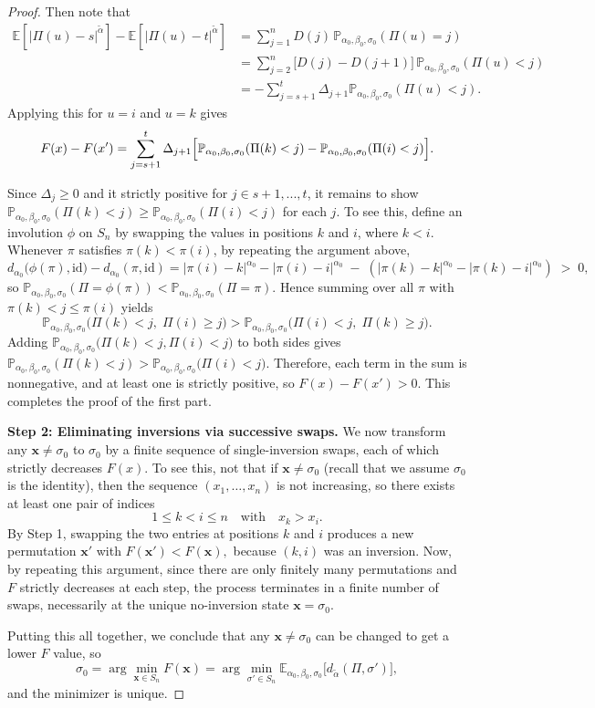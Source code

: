 \documentclass{article}
\renewcommand{\P}{\mathbb{P}}
\begin{document}
\begin{proof}
Then note that
\begin{align*}
    \mathbb{E}[|\Pi(u)-s|^{\tilde\alpha}]-\mathbb{E}[|\Pi(u)-t|^{\tilde\alpha}]
&=\sum_{j=1}^nD(j)\,\P_{\alpha_0,\beta_0,\sigma_0}(\Pi(u)=j)
\\&=\sum_{j=2}^n\bigl[D(j)-D(j+1)\bigr]\,\P_{\alpha_0,\beta_0,\sigma_0}(\Pi(u)<j)
\\&=-\sum_{j=s+1}^t\Delta_{j+1}\P_{\alpha_0,\beta_0,\sigma_0}(\Pi(u)<j).
\end{align*}
Applying this for $u=i$ and $u=k$ gives
\[
F(x)-F(x')
=\sum_{j=s+1}^t\Delta_{j+1}\Bigl[\P_{\alpha_0,\beta_0,\sigma_0}(\Pi(k)<j)-\P_{\alpha_0,\beta_0,\sigma_0}(\Pi(i)<j)\Bigr].
\]

Since $\Delta_j\geq 0$ and it strictly positive for $j\in{s+1,...,t}$, it remains to show $\P_{\alpha_0,\beta_0,\sigma_0}(\Pi(k)<j)\ge \P_{\alpha_0,\beta_0,\sigma_0}(\Pi(i)<j)$ for each $j$.  To see this, define an involution $\phi$ on $S_n$ by swapping the values in positions $k$ and $i$, where $k<i$.  Whenever $\pi$ satisfies
$\pi(k)< \pi(i)$,
by repeating the argument above,
\[
d_{\alpha_0}\bigl(\phi(\pi),\mathrm{id}\bigr)
-d_{\alpha_0}(\pi,\mathrm{id})
=\bigl|\pi(i)-k\bigr|^{\alpha_0}-\bigl|\pi(i)-i\bigr|^{\alpha_0}
\;-\;(\bigl|\pi(k)-k\bigr|^{\alpha_0}-\bigl|\pi(k)-i\bigr|^{\alpha_0})
\;>\;0,
\]
so $\P_{\alpha_0,\beta_0,\sigma_0}(\Pi=\phi(\pi))<\P_{\alpha_0,\beta_0,\sigma_0}(\Pi=\pi)$.  Hence summing over all $\pi$ with $\pi(k)<j\le\pi(i)$ yields
\[
\P_{\alpha_0,\beta_0,\sigma_0}\bigl(\Pi(k)<j,\;\Pi(i)\ge j\bigr)
> \P_{\alpha_0,\beta_0,\sigma_0}\bigl(\Pi(i)<j,\;\Pi(k)\ge j\bigr).
\]
Adding $\P_{\alpha_0,\beta_0,\sigma_0}\Big(\Pi(k)<j,\Pi(i)<j\Big)$ to both sides gives 
$\P_{\alpha_0,\beta_0,\sigma_0}(\Pi(k)<j)>\P_{\alpha_0,\beta_0,\sigma_0}\Big(\Pi(i)<j\Big)$.  
Therefore, each term in the sum is nonnegative, and at least one is strictly positive, so $F(x)-F(x')>0$.  This completes the proof of the first part.


\noindent\textbf{Step 2: Eliminating inversions via successive swaps.}  
We now transform any \(\mathbf x\neq \sigma_0\) to $\sigma_0$ by a finite sequence of single-inversion swaps, each of which strictly decreases \(F(x)\).  To see this, not that
if \(\mathbf x\neq\sigma_0\) (recall that we assume $\sigma_0$ is the identity), then the sequence \((x_1,\dots,x_n)\) is not increasing, so there exists at least one pair of indices
\[
1\le k<i\le n
\quad\text{with}\quad
x_k > x_i.
\]
By Step 1, swapping the two entries at positions \(k\) and \(i\) produces a new permutation
\(
\mathbf x'\)
with
$F(\mathbf x')<F(\mathbf x),$
because \((k,i)\) was an inversion.
Now,  by repeating this argument, since there are only finitely many permutations and \(F\) strictly decreases at each step, the process terminates in a finite number of swaps, necessarily at the unique no-inversion state \(\mathbf x=\sigma_0\).


Putting this all together, we conclude that any \(\mathbf x\neq\sigma_0\) can be changed to get a lower $F$ value, so
\[
\sigma_0=\arg\min_{\mathbf x\in S_n}F(\mathbf x)
=\arg\min_{\sigma'\in S_n}\mathbb{E}_{{\alpha_0,\beta_0,\sigma_0}}\bigl[d_{\tilde \alpha}(\Pi,\sigma')\bigr],
\]
and the minimizer is unique.  
\end{proof}
\end{document}

